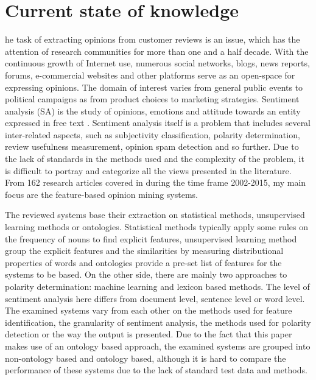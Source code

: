 %
%
\let\textcircled=\pgftextcircled
\chapter{Current state of knowledge}
\label{chap:02}

he task of extracting opinions from customer reviews is an issue, which has the attention of research communities for more than one and a half decade. With the continuous growth of Internet use, numerous social networks, blogs, news reports, forums, e-commercial websites and other platforms serve as an open-space for expressing opinions. The domain of interest varies from general public events to political campaigns as from product choices to marketing strategies. Sentiment analysis (SA) is the study of opinions, emotions and attitude towards an entity expressed in free text \cite{ravi2015survey}. Sentiment analysis itself is a problem that includes several inter-related aspects, such as subjectivity classification, polarity determination, review usefulness measurement, opinion spam detection and so further. Due to the lack of standards in the methods used and the complexity of the problem, it is difficult to portray and categorize all the views presented in the literature. From 162 research articles covered in \cite{ravi2015survey} during the time frame 2002-2015, my main focus are the feature-based opinion mining systems. 

The reviewed systems base their extraction on statistical methods, unsupervised learning methods or ontologies. Statistical methods typically apply some rules on the frequency of nouns to find explicit features,  unsupervised learning method group the explicit features and the similarities by measuring distributional properties of words and ontologies provide a pre-set list of features for the systems to be based.
On the other side, there are mainly two approaches to polarity determination: machine learning and lexicon based methods. The level of sentiment analysis here differs from document level, sentence level or word level. The examined systems vary from each other on the methods used for feature identification, the granularity of sentiment analysis, the methods used for polarity detection or the way the output is presented. Due to the fact that this paper makes use of an ontology based approach, the examined systems are grouped into non-ontology based and ontology based, although it is hard to compare the performance of these systems due to the lack of standard test data and methods.

